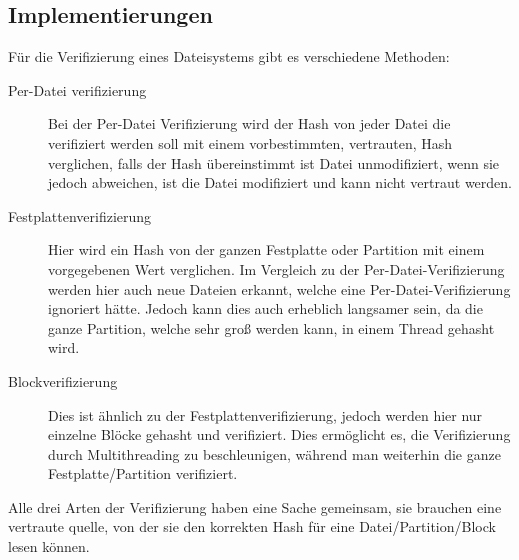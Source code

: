 \subsection{Implementierungen}
Für die Verifizierung eines Dateisystems gibt es verschiedene Methoden:
\begin{description}
\item[Per-Datei verifizierung]
  Bei der Per-Datei Verifizierung wird der Hash von jeder Datei die verifiziert werden soll mit einem vorbestimmten, vertrauten, Hash verglichen, falls der Hash übereinstimmt ist Datei unmodifiziert, wenn sie jedoch abweichen, ist die Datei modifiziert und kann nicht vertraut werden.
\item[Festplattenverifizierung]
  Hier wird ein Hash von der ganzen Festplatte oder Partition mit einem vorgegebenen Wert verglichen. Im Vergleich zu der Per-Datei-Verifizierung werden hier auch neue Dateien erkannt, welche eine Per-Datei-Verifizierung ignoriert hätte. Jedoch kann dies auch erheblich langsamer sein, da die ganze Partition, welche sehr groß werden kann, in einem Thread gehasht wird.
\item[Blockverifizierung]
  Dies ist ähnlich zu der Festplattenverifizierung, jedoch werden hier nur einzelne Blöcke gehasht und verifiziert. Dies ermöglicht es, die Verifizierung durch Multithreading zu beschleunigen, während man weiterhin die ganze Festplatte/Partition verifiziert.
\end{description}
Alle drei Arten der Verifizierung haben eine Sache gemeinsam, sie brauchen eine vertraute quelle, von der sie den korrekten Hash für eine Datei/Partition/Block lesen können.
